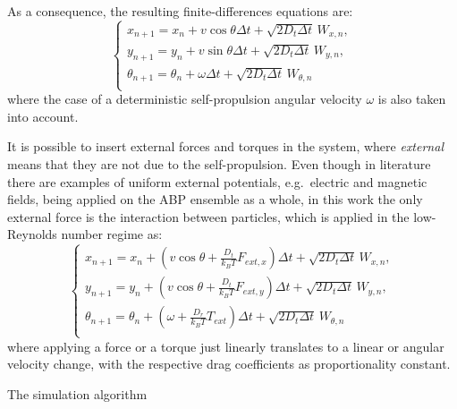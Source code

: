 \documentclass[../../master_thesis_np.tex]{subfiles}
\begin{document}
	As a consequence, the resulting finite-differences equations are:
	\begin{equation} \label{eq:fin_diff1}
		\begin{cases}
			x_{n+1} = x_n + v \cos\theta \Delta t + \sqrt{2D_t \Delta t} \, W_{x,n},\\
			y_{n+1} = y_n + v \sin\theta \Delta t + \sqrt{2D_t \Delta t} \, W_{y,n},\\
			\theta_{n+1} = \theta_n + \omega \Delta t + \sqrt{2D_t \Delta t} \, W_{\theta,n}\\
		\end{cases}
	\end{equation}
	where the case of a deterministic self-propulsion angular velocity $\omega$ is also taken into account.

	It is possible to insert external forces and torques in the system, where \emph{external} means that they are not due to the self-propulsion. Even though in literature there are examples of uniform external potentials, e.g.\ electric and magnetic fields, being applied on the ABP ensemble as a whole, in this work the only external force is the interaction between particles, which is applied in the low-Reynolds number regime as:
	\begin{equation} \label{eq:fin_diff_with_forces}
		\begin{cases}
			x_{n+1} = x_n + \left( v \cos\theta + \frac{D_t}{k_B T} F_{ext,x} \right) \Delta t + \sqrt{2D_t \Delta t} \, W_{x,n},\\
			y_{n+1} = y_n + \left( v \cos\theta + \frac{D_t}{k_B T} F_{ext,y} \right) \Delta t + \sqrt{2D_t \Delta t} \, W_{y,n},\\
			\theta_{n+1} = \theta_n +\left(\omega + \frac{D_r}{k_B T}{}T_{ext}\right) \Delta t + \sqrt{2D_t \Delta t} \, W_{\theta,n}\\
		\end{cases}
	\end{equation}
	where applying a force or a torque just linearly translates to a linear or angular velocity change, with the respective drag coefficients as proportionality constant.

	\begin{algorithm}
		\caption{The simulation algorithm} \label{alg:sim1}	
		\begin{algorithmic}[1]
			\EndFor
				\EndFor
			\EndFor
		\end{algorithmic}
		\end{algorithm}
\end{document}
